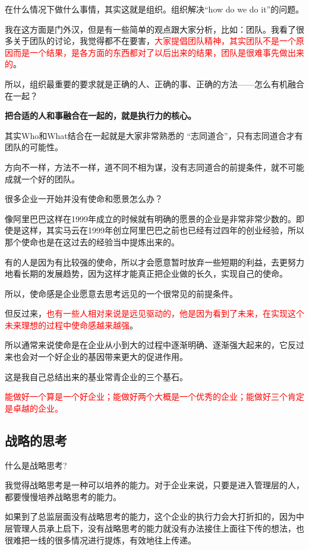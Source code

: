 \documentclass[12pt]{article}
\begin{document}
在什么情况下做什么事情，其实这就是组织。组织解决“how do we do it”的问题。

我在这方面是门外汉，但是有一些简单的观点跟大家分析，比如：团队。我看了很多关于团队的讨论，我觉得都不在要害，\textcolor{red}{大家提倡团队精神，其实团队不是一个原因而是一个结果，是各方面的东西都对了以后出来的结果，团队是很难事先做出来的}。

所以，组织最重要的要求就是正确的人、正确的事、正确的方法——怎么有机融合在一起？

\textbf{把合适的人和事融合在一起的，就是执行力的核心。}

其实Who和What结合在一起就是大家非常熟悉的 “志同道合”，只有志同道合才有团队的可能性。

方向不一样，方法不一样，道不同不相为谋，没有志同道合的前提条件，就不可能成就一个好的团队。

很多企业一开始并没有使命和愿景怎么办？

像阿里巴巴这样在1999年成立的时候就有明确的愿景的企业是非常非常少数的。即使是这样，其实马云在1999年创立阿里巴巴之前也已经有过四年的创业经验，所以那个使命也是在这过去的经验当中提炼出来的。

有的人是因为有比较强的使命，所以才会愿意暂时放弃一些短期的利益，去更努力地看长期的发展趋势，因为这样才能真正把企业做的长久，实现自己的使命。

所以，使命感是企业愿意去思考远见的一个很常见的前提条件。

但反过来，\textcolor{red}{也有一些人相对来说是远见驱动的，他是因为看到了未来，在实现这个未来理想的过程中使命感越来越强}。

所以通常来说使命是在企业从小到大的过程中逐渐明确、逐渐强大起来的，它反过来也会对一个好企业的基因带来更大的促进作用。

这是我自己总结出来的基业常青企业的三个基石。

\textcolor{red}{能做好一个算是一个好企业；能做好两个大概是一个优秀的企业；能做好三个肯定是卓越的企业。}

\subsection{战略的思考}
什么是战略思考?

我觉得战略思考是一种可以培养的能力。对于企业来说，只要是进入管理层的人，都要慢慢培养战略思考的能力。

如果到了总监层面没有战略思考的能力，这个企业的执行力会大打折扣的，因为中层管理人员承上启下，没有战略思考的能力就没有办法接住上面往下传的想法，也很难把一线的很多情况进行提炼，有效地往上传递。
\end{document}
